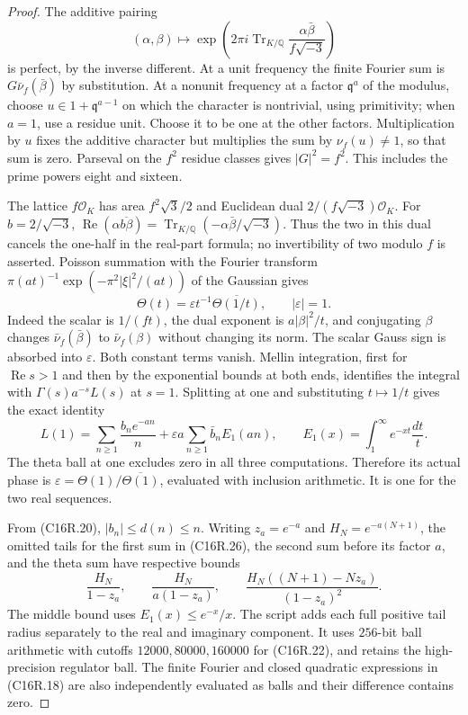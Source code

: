 \begin{proof}
The additive pairing
\[
 (\alpha,\beta)\longmapsto
 \exp\left(2\pi i\operatorname{Tr}_{K/\mathbb Q}
                   \frac{\alpha\bar\beta}{f\sqrt{-3}}\right)
 \tag{C16R.24}
\]
is perfect, by the inverse different.  At a unit frequency the
finite Fourier sum is $G\bar\nu_f(\bar\beta)$ by substitution.
At a nonunit frequency at a factor $\mathfrak q^a$ of the modulus,
choose $u\in1+\mathfrak q^{a-1}$ on which the character is
nontrivial, using primitivity; when $a=1$, use a residue unit.
Choose it to be one at the other factors.  Multiplication by $u$
fixes the additive character but multiplies the sum by
$\nu_f(u)\ne1$, so that sum is zero.
Parseval on the $f^2$ residue classes gives $|G|^2=f^2$.
This includes the prime powers eight and sixteen.

The lattice $f\mathcal O_K$ has area $f^2\sqrt3/2$ and
Euclidean dual $2/(f\sqrt{-3})\mathcal O_K$.
For $b=2/\sqrt{-3}$,
$\operatorname{Re}(\alpha\overline{b\beta})
 =\operatorname{Tr}_{K/\mathbb Q}(-\alpha\bar\beta/\sqrt{-3})$.
Thus the two in this dual cancels the one-half in the real-part
formula; no invertibility of two modulo $f$ is asserted.
Poisson summation with the Fourier transform
$\pi(at)^{-1}\exp(-\pi^2|\xi|^2/(at))$ of the Gaussian gives
\[
 \Theta(t)=\varepsilon t^{-1}\overline{\Theta(1/t)},
          \qquad |\varepsilon|=1.
 \tag{C16R.25}
\]
Indeed the scalar is $1/(ft)$, the dual exponent is
$a|\beta|^2/t$, and conjugating $\beta$ changes
$\bar\nu_f(\bar\beta)$ to $\bar\nu_f(\beta)$ without changing
its norm.  The scalar Gauss sign is absorbed into $\varepsilon$.
Both constant terms vanish.  Mellin integration, first for
$\operatorname{Re}s>1$ and then by the exponential bounds at both
ends, identifies the integral with $\Gamma(s)a^{-s}L(s)$ at $s=1$.
Splitting at one and substituting $t\mapsto1/t$ gives the exact identity
\[
 L(1)=\sum_{n\ge1}\frac{b_ne^{-an}}n
       +\varepsilon a\sum_{n\ge1}\bar b_n E_1(an),
 \qquad E_1(x)=\int_1^\infty e^{-xt}\frac{dt}{t}.
 \tag{C16R.26}
\]
The theta ball at one excludes zero in all three computations.
Therefore its actual phase is
$\varepsilon=\Theta(1)/\overline{\Theta(1)}$, evaluated with
inclusion arithmetic.  It is one for the two real sequences.

From (C16R.20), $|b_n|\le d(n)\le n$.
Writing $z_a=e^{-a}$ and $H_N=e^{-a(N+1)}$, the omitted tails
for the first sum in (C16R.26), the second sum before its factor
$a$, and the theta sum have respective bounds
\[
 \frac{H_N}{1-z_a},\qquad
 \frac{H_N}{a(1-z_a)},\qquad
 \frac{H_N((N+1)-Nz_a)}{(1-z_a)^2}.
 \tag{C16R.27}
\]
The middle bound uses $E_1(x)\le e^{-x}/x$.
The script adds each full positive tail radius separately to the
real and imaginary component.  It uses $256$-bit ball arithmetic
with cutoffs $12000,80000,160000$ for (C16R.22), and retains the
high-precision regulator ball.  The finite Fourier and closed
quadratic expressions in (C16R.18) are also independently evaluated
as balls and their difference contains zero.


\end{proof}
